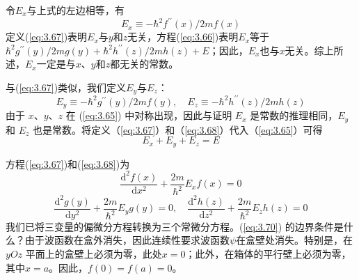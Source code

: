 	令$E_x$与上式的左边相等，有
	\begin{equation}
		E_x \equiv -\hbar^2f^{\prime\prime}\left(x\right)/2mf\left(x\right)
		\label{eq:3.67}
	\end{equation}
	定义(\ref{eq:3.67})表明$E_x$与$y$和$z$无关，方程(\ref{eq:3.66})表明$E_x$等于$\hbar^2g^{\prime\prime}\left(y\right)/2mg\left(y\right)+\hbar^2h^{\prime\prime}\left(z\right)/2mh\left(z\right)+E$；因此，$E_x$也与$x$无关。综上所述，$E_x$一定是与$x$、$y$和$z$都无关的常数。

	与(\ref{eq:3.67})类似，我们定义$E_y$与$E_z$：
	\begin{equation}
		E_y \equiv -\hbar^2g^{\prime\prime}\left(y\right)/2mf\left(y\right), \quad E_z \equiv -\hbar^2h^{\prime\prime}\left(z\right)/2mh\left(z\right)
		\label{eq:3.68}
	\end{equation}
	由于 $x$、$y$、$z$ 在 (\ref{eq:3.65}) 中对称出现，因此与证明 $E_x$ 是常数的推理相同，$E_y$ 和 $E_z$ 也是常数。将定义（\ref{eq:3.67}）和（\ref{eq:3.68}）代入（\ref{eq:3.65}）可得
	\begin{equation}
		E_x+E_y+E_z=E
		\label{eq:3.69}
	\end{equation}

	方程(\ref{eq:3.67})和(\ref{eq:3.68})为
	\begin{equation}
		\frac{\mathrm{d}^2f\left(x\right)}{\mathrm{d}x^2}+\frac{2m}{\hbar^2}E_xf\left(x\right) = 0
		\label{eq:3.70}
	\end{equation}
	\begin{equation}
		\frac{\mathrm{d}^2g\left(y\right)}{\mathrm{d}y^2}+\frac{2m}{\hbar^2}E_yg\left(y\right) = 0, \quad \frac{\mathrm{d}^2h\left(z\right)}{\mathrm{d}z^2}+\frac{2m}{\hbar^2}E_zh\left(z\right) = 0
		\label{eq:3.71}
	\end{equation}
	我们已将三变量的偏微分方程转换为三个常微分方程。(\ref{eq:3.70}) 的边界条件是什么？由于波函数在盒外消失，因此连续性要求波函数$\psi$在盒壁处消失。特别是，在 $yOz$ 平面上的盒壁上必须为零，此处$x=0$；此外，在箱体的平行壁上必须为零，其中$x=a$。因此，$f\left(0\right) = f\left(a\right) = 0$。


